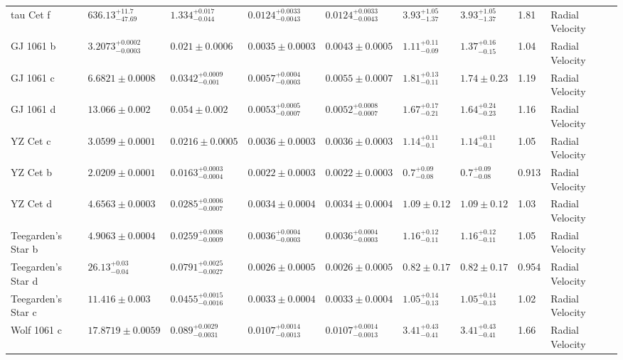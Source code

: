 \begin{tabular}{llllllllll}
tau Cet f & $636.13^{+11.7}_{-47.69}$ & $1.334^{+0.017}_{-0.044}$ & $0.0124^{+0.0033}_{-0.0043}$ & $0.0124^{+0.0033}_{-0.0043}$ & $3.93^{+1.05}_{-1.37}$ & $3.93^{+1.05}_{-1.37}$ & 1.81 & Radial Velocity & \cite{FENG_ET_AL__2017} \\
GJ 1061 b & $3.2073^{+0.0002}_{-0.0003}$ & $0.021 \pm 0.0006$ & $0.0035 \pm 0.0003$ & $0.0043 \pm 0.0005$ & $1.11^{+0.11}_{-0.09}$ & $1.37^{+0.16}_{-0.15}$ & 1.04 & Radial Velocity & \cite{DREIZLER_ET_AL_2025} \\
GJ 1061 c & $6.6821 \pm 0.0008$ & $0.0342^{+0.0009}_{-0.001}$ & $0.0057^{+0.0004}_{-0.0003}$ & $0.0055 \pm 0.0007$ & $1.81^{+0.13}_{-0.11}$ & $1.74 \pm 0.23$ & 1.19 & Radial Velocity & \cite{DREIZLER_ET_AL_2025} \\
GJ 1061 d & $13.066 \pm 0.002$ & $0.054 \pm 0.002$ & $0.0053^{+0.0005}_{-0.0007}$ & $0.0052^{+0.0008}_{-0.0007}$ & $1.67^{+0.17}_{-0.21}$ & $1.64^{+0.24}_{-0.23}$ & 1.16 & Radial Velocity & \cite{DREIZLER_ET_AL_2025} \\
YZ Cet c & $3.0599 \pm 0.0001$ & $0.0216 \pm 0.0005$ & $0.0036 \pm 0.0003$ & $0.0036 \pm 0.0003$ & $1.14^{+0.11}_{-0.1}$ & $1.14^{+0.11}_{-0.1}$ & 1.05 & Radial Velocity & \cite{STOCK_ET_AL__2020} \\
YZ Cet b & $2.0209 \pm 0.0001$ & $0.0163^{+0.0003}_{-0.0004}$ & $0.0022 \pm 0.0003$ & $0.0022 \pm 0.0003$ & $0.7^{+0.09}_{-0.08}$ & $0.7^{+0.09}_{-0.08}$ & 0.913 & Radial Velocity & \cite{STOCK_ET_AL__2020} \\
YZ Cet d & $4.6563 \pm 0.0003$ & $0.0285^{+0.0006}_{-0.0007}$ & $0.0034 \pm 0.0004$ & $0.0034 \pm 0.0004$ & $1.09 \pm 0.12$ & $1.09 \pm 0.12$ & 1.03 & Radial Velocity & \cite{STOCK_ET_AL__2020} \\
Teegarden's Star b & $4.9063 \pm 0.0004$ & $0.0259^{+0.0008}_{-0.0009}$ & $0.0036^{+0.0004}_{-0.0003}$ & $0.0036^{+0.0004}_{-0.0003}$ & $1.16^{+0.12}_{-0.11}$ & $1.16^{+0.12}_{-0.11}$ & 1.05 & Radial Velocity & \cite{DREIZLER_ET_AL_2024} \\
Teegarden's Star d & $26.13^{+0.03}_{-0.04}$ & $0.0791^{+0.0025}_{-0.0027}$ & $0.0026 \pm 0.0005$ & $0.0026 \pm 0.0005$ & $0.82 \pm 0.17$ & $0.82 \pm 0.17$ & 0.954 & Radial Velocity & \cite{DREIZLER_ET_AL_2024} \\
Teegarden's Star c & $11.416 \pm 0.003$ & $0.0455^{+0.0015}_{-0.0016}$ & $0.0033 \pm 0.0004$ & $0.0033 \pm 0.0004$ & $1.05^{+0.14}_{-0.13}$ & $1.05^{+0.14}_{-0.13}$ & 1.02 & Radial Velocity & \cite{DREIZLER_ET_AL_2024} \\
Wolf 1061 c & $17.8719 \pm 0.0059$ & $0.089^{+0.0029}_{-0.0031}$ & $0.0107^{+0.0014}_{-0.0013}$ & $0.0107^{+0.0014}_{-0.0013}$ & $3.41^{+0.43}_{-0.41}$ & $3.41^{+0.43}_{-0.41}$ & 1.66 & Radial Velocity & \cite{ASTUDILLO_DEFRU_ET_AL__2017} \\

\end{tabular}
